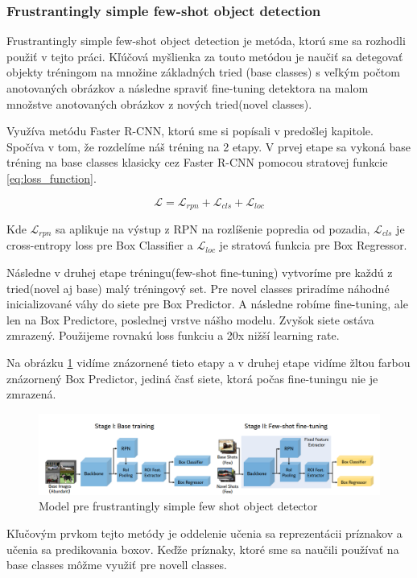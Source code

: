 \subsubsection{Frustrantingly simple few-shot object detection}

\hspace{\parindent}Frustrantingly simple few-shot object detection \cite{FSFSODT} je metóda, ktorú sme sa rozhodli použiť v tejto práci. Kľúčová myšlienka za touto metódou je naučiť sa detegovať objekty tréningom na množine základných tried (base classes) s veľkým počtom anotovaných obrázkov a následne spraviť fine-tuning detektora na malom množstve anotovaných obrázkov z nových tried(novel classes). 

Využíva metódu Faster R-CNN, ktorú sme si popísali v predošlej kapitole. Spočíva v tom, že rozdelíme náš tréning na 2 etapy. V prvej etape sa vykoná base tréning na base classes klasicky cez Faster R-CNN pomocou stratovej funkcie \ref{eq:loss_function}. 

\begin{equation}
\mathcal{L} = \mathcal{L}_{rpn} + \mathcal{L}_{cls} + \mathcal{L}_{loc}
\label{eq:loss_function}
\end{equation}

Kde $\mathcal{L}_{rpn}$ sa aplikuje na výstup z RPN na rozlíšenie popredia od pozadia, $\mathcal{L}_{cls}$ je cross-entropy loss pre Box Classifier a $\mathcal{L}_{loc}$ je stratová funkcia pre Box Regressor.

Následne v druhej etape tréningu(few-shot fine-tuning) vytvoríme pre každú z tried(novel aj base) malý tréningový set. Pre novel classes priradíme náhodné inicializované váhy do siete pre Box Predictor. A následne robíme fine-tuning, ale len na Box Predictore, poslednej vrstve nášho modelu. Zvyšok siete ostáva zmrazený. Použijeme rovnakú loss funkciu a 20x nižší learning rate.

Na obrázku \ref{fig:image305} vidíme znázornené tieto etapy a v druhej etape vidíme žltou farbou znázornený Box Predictor, jediná časť siete, ktorá počas fine-tuningu nie je zmrazená.

\begin{figure}[H]
\includegraphics[width=\textwidth]{images/FSFSOD_model.png}
\caption{Model pre frustrantingly simple few shot object detector}
\label{fig:image305}
\end{figure}

Kľučovým prvkom tejto metódy je oddelenie učenia sa reprezentácii príznakov a učenia sa predikovania boxov. Keďže príznaky, ktoré sme sa naučili používať na base classes môžme využiť pre novell classes.

